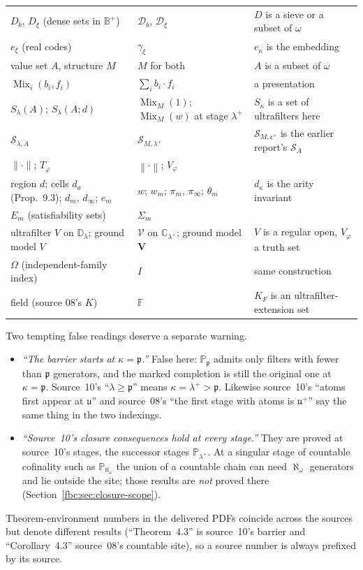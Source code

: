 \documentclass[11pt,letterpaper]{article}
\theoremstyle{definition}
\theoremstyle{remark}
\newcommand{\om}{\omega}
\newcommand{\B}{\mathbb B}
\newcommand{\C}{\mathbb C}
\newcommand{\PP}{\mathbb P}
\newcommand{\cp}{\mathfrak p}
\newcommand{\cu}{\mathfrak u}
\newcommand{\cc}{\mathfrak c}
\newcommand{\Mix}{\operatorname{Mix}}
\newcommand{\Ssh}{\mathscr S}
\newcommand{\cV}{\mathcal V}
\newcommand{\bV}{\mathbf V}
\newcommand{\Fd}{\mathbb F}
\newcommand{\truth}[1]{\left\lVert #1\right\rVert}
\begin{document}
{\begin{longtable}{@{}>{\raggedright\arraybackslash}p{}>{\raggedright\arraybackslash}p{}>{\raggedright\arraybackslash}p{}@{}}
$D_b$, $D_\xi$ (dense sets in $\B^+$) & $\mathcal D_b$, $\mathcal D_\xi$ & $D$ is a sieve or a subset of $\om$\\
$e_\xi$ (real codes) & $\gamma_\xi$ & $e_\kappa$ is the embedding\\
value set $A$, structure $M$ & $M$ for both & $A$ is a subset of $\om$\\
$\operatorname{Mix}_i(b_i,f_i)$ & $\sum_i b_i\cdot f_i$ & a presentation\\
$S_\lambda(A)$; $S_\lambda(A;d)$ & $\Mix_M(1)$; $\Mix_M(w)$ at stage $\lambda^+$ & $S_\kappa$ is a set of ultrafilters here\\
$\Ssh_{\lambda,A}$ & $\Ssh_{M,\lambda^+}$ & $\Ssh_{M,\cc^+}$ is the earlier report's $\mathcal S_A$\\
$\lVert\cdot\rVert$; $T_\varphi$ & $\truth{\cdot}$; $V_\varphi$ & \\
region $d$; cells $d_a$ (Prop.~9.3); $d_m$, $d_\infty$; $e_m$ & $w$; $w_m$; $\pi_m$, $\pi_\infty$; $\theta_m$ & $d_\kappa$ is the arity invariant\\
$E_m$ (satisfiability sets) & $\Sigma_m$ & \\
ultrafilter $V$ on $\mathbb D_\lambda$; ground model $V$ & $\cV$ on $\C_{\lambda^+}$; ground model $\bV$ & $V$ is a regular open, $V_\varphi$ a truth set\\
$\Omega$ (independent-family index) & $I$ & same construction\\
field (source 08's $K$) & $\Fd$ & $K_F$ is an ultrafilter-extension set\\
\bottomrule
\end{longtable}}
\noindent Two tempting false readings deserve a separate warning.
\begin{itemize}
\item \emph{``The barrier starts at $\kappa=\cp$.''} False here: $\PP_\cp$
admits only filters with fewer than $\cp$ generators, and the marked
completion is still the original one at $\kappa=\cp$. Source~10's
``$\lambda\geq\cp$'' means $\kappa=\lambda^+>\cp$. Likewise source~10's
``atoms first appear at $\cu$'' and source~08's ``the first stage with
atoms is $\cu^+$'' say the same thing in the two indexings.
\item \emph{``Source~10's closure consequences hold at every stage.''}
They are proved at source~10's stages, the successor stages
$\PP_{\lambda^+}$. At a singular stage of countable cofinality such as
$\PP_{\aleph_\om}$ the union of a countable chain can need $\aleph_\om$
generators and lie outside the site; those results are \emph{not}
proved there (Section~\ref{fbc:sec:closure-scope}).
\end{itemize}
Theorem-environment numbers in the delivered PDFs coincide across the
sources but denote different results (``Theorem~4.3'' is source~10's
barrier and ``Corollary~4.3'' source~08's countable site), so a source
number is always prefixed by its source.
\end{document}
